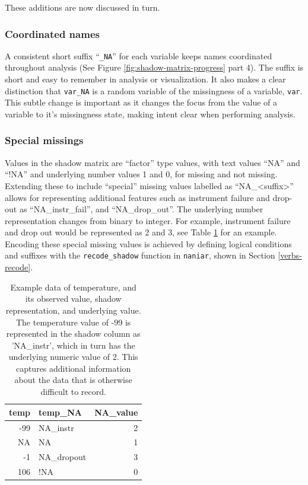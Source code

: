 \documentclass[]{article}
\theoremstyle{definition}
\theoremstyle{definition}
\theoremstyle{definition}
\theoremstyle{remark}
\begin{document}
These additions are now discussed in turn.

\hypertarget{coordinated-names}{%
\subsubsection{Coordinated names}\label{coordinated-names}}

A consistent short suffix ``\texttt{\_NA}'' for each variable keeps
names coordinated throughout analysis (See Figure
\ref{fig:shadow-matrix-progress} part 4). The suffix is short and easy
to remember in analysis or visualization. It also makes a clear
distinction that \texttt{var\_NA} is a random variable of the
missingness of a variable, \texttt{var}. This subtle change is important
as it changes the focus from the value of a variable to it's missingness
state, making intent clear when performing analysis.

\hypertarget{special-missings}{%
\subsubsection{Special missings}\label{special-missings}}

Values in the shadow matrix are ``factor'' type values, with text values
``NA'' and ``!NA'' and underlying number values 1 and 0, for missing and
not missing. Extending these to include ``special'' missing values
labelled as ``NA\_\textless{}suffix\textgreater{}'' allows for
representing additional features such as instrument failure and drop-out
as ``NA\_instr\_fail'', and ``NA\_drop\_out''. The underlying number
representation changes from binary to integer. For example, instrument
failure and drop out would be represented as 2 and 3, see Table
\ref{tab:shadow-encoding} for an example. Encoding these special missing
values is achieved by defining logical conditions and suffixes with the
\texttt{recode\_shadow} function in \texttt{naniar}, shown in Section
\ref{verbs-recode}.

\begin{table}[!h]

\caption{\label{tab:shadow-encoding}Example data of temperature, and its observed value, shadow representation, and underlying value. The temperature value of -99 is represented in the shadow column as 'NA\_instr', which in turn has the underlying numeric value of 2. This captures additional information about the data that is otherwise difficult to record.}
\centering
\begin{tabular}[t]{rlr}
\toprule
temp & temp\_NA & NA\_value\\
\midrule
-99 & NA\_instr & 2\\
NA & NA & 1\\
-1 & NA\_dropout & 3\\
106 & !NA & 0\\
\bottomrule
\end{tabular}
\end{table}
\end{document}
